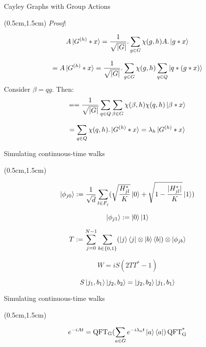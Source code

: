 \documentclass{beamer}
\theoremstyle{definition}
\begin{document}
\begin{frame}{Cayley Graphs with Group Actions}
    
    \begin{textblock*}{12cm}(0.5cm,1.5cm)
        \textit{Proof}:

        \[
        A\ket{G^{(h)}*x} = \frac{1}{\sqrt{|G|}}.\sum_{g \in G}\chi(g,h) A.\ket{g*x}
        \]

        \[
        = A\ket{G^{(h)}*x} = \frac{1}{\sqrt{|G|}}.\sum_{g \in G}\chi(g,h)\sum_{q \in Q}\ket{q*(g*x)}
        \]
        Consider $\beta = qg$. Then:
        \[
        = = \frac{1}{\sqrt{|G|}}\sum_{q \in Q}\sum_{\beta \in G}\chi(\beta,h)\chi(q,h)\ket{\beta * x}
        \]

        \[
        = \sum_{q \in Q}\chi(q,h).\ket{G^{(h)}*x} = \lambda_h \ket{G^{(h)}*x}
        \]

    \end{textblock*}

\end{frame}





\begin{frame}{Simulating continuous-time walks}
    
    \begin{textblock*}{12cm}(0.5cm,1.5cm)
      
        \[
        \ket{\phi_{j0}} := \frac{1}{\sqrt{d}}\sum_{l \in F_j}(\sqrt{\frac{H^*_{jl}}{K}}\ket{0} + \sqrt{1-\frac{|H^*_{jl}|}{K}}\ket{1})
        \]

        \[
        \ket{\phi_{j1}} := \ket{0}\ket{1} 
        \]

        \[
        T := \sum_{j=0}^{N-1}\sum_{b \in {\{0,1\}}}(\ket{j}\bra{j}\otimes\ket{b}\bra{b})\otimes\ket{\phi_{jb}}
        \]

        \[
        W = iS(2TT^* - 1)
        \]

        \[
        S\ket{j_1,b_1}\ket{j_2,b_2} = \ket{j_2,b_2}\ket{j_1,b_1}
        \]



    \end{textblock*}

\end{frame}




\begin{frame}{Simulating continuous-time walks}
    
    \begin{textblock*}{12cm}(0.5cm,1.5cm)
      
       \[
       e^{-iAt} = \operatorname{QFT_G}(\sum_{a \in G}e^{-i\lambda_at}\ket{a}\bra{a})\operatorname{QFT^*_G}
       \]




    \end{textblock*}

\end{frame}
\end{document}
